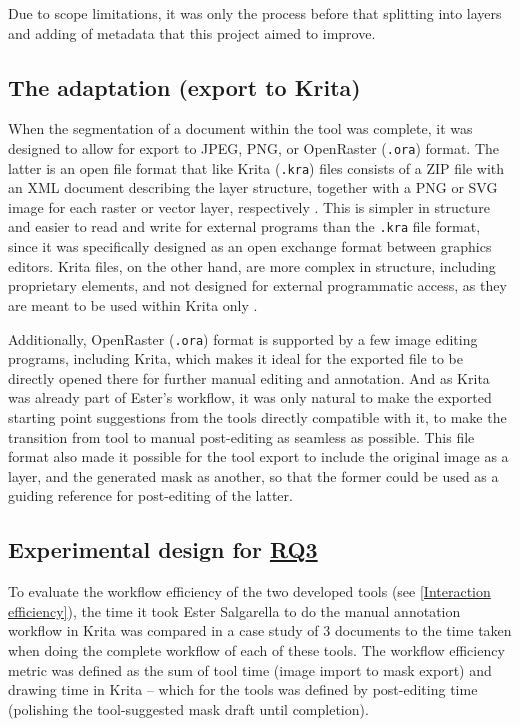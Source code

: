 Due to scope limitations, it was only the process before that splitting into layers and adding of metadata that this project aimed to improve.
\subsection{The adaptation (export to Krita)}
\label{subsection:export_to_krita}
When the segmentation of a document within the tool was complete, it was designed to allow for export to JPEG, PNG, or OpenRaster (\texttt{.ora}) format.
The latter is an open file format that like Krita (\texttt{.kra}) files consists of a ZIP file with an XML document describing the layer structure, together with a PNG or SVG image for each raster or vector layer, respectively \parencite{OpenRasterSpec}. 
This is simpler in structure and easier to read and write for external programs than the \texttt{.kra} file format, since it was specifically designed as an open exchange format between graphics editors.
Krita files, on the other hand, are more complex in structure, including proprietary elements, and not designed for external programmatic access, as they are meant to be used within Krita only \parencite{KritaDocs}. 

Additionally, OpenRaster (\texttt{.ora}) format is supported by a few image editing programs, including Krita, which makes it ideal for the exported file to be directly opened there for further manual editing and annotation.
And as Krita was already part of Ester's workflow, it was only natural to make the exported starting point suggestions from the tools directly compatible with it, to make the transition from tool to manual post-editing as seamless as possible.
This file format also made it possible for the tool export to include the original image as a layer, and the generated mask as another, so that the former could be used as a guiding reference for post-editing of the latter.

\subsection{Experimental design for \hyperref[rq3]{\acs{RQ}3}} \label{subsec:experimental_design_workflow_efficiency}
To evaluate the workflow efficiency of the two developed tools (see \cref{Interaction efficiency}), the time it took Ester Salgarella to do the manual annotation workflow in Krita was compared in a case study of 3 documents to the time taken when doing the complete workflow of each of these tools.
The workflow efficiency metric was defined as the sum of tool time (image import to mask export) and drawing time in Krita -- which for the tools was defined by post-editing time (polishing the tool-suggested mask draft until completion).

